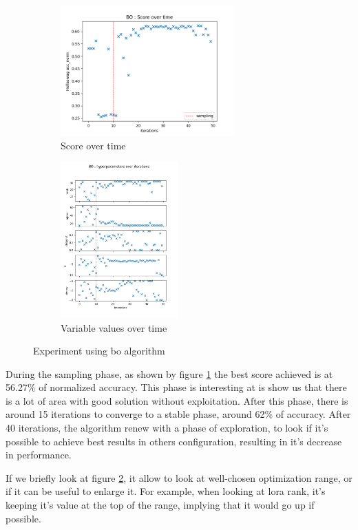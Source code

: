 \begin{figure}[h!]
    \centering
    \begin{subfigure}[b]{.45\textwidth}
      \centering
      \includegraphics[height = 5cm]{assets/img/chap_4/experiments/plots/exp12_score_over_time.png}
      \caption{Score over time}
      \label{fig:exp12_score_time}
    \end{subfigure}%
    \begin{subfigure}[b]{.45\textwidth}
      \centering
      \includegraphics[height = 6cm]{assets/img/chap_4/experiments/plots/exp12_variables_over_time.png}
      \caption{Variable values over time}
      \label{fig:exp12_var_time}
    \end{subfigure}
    \caption{Experiment using \acrshort{bo} algorithm}
    \label{fig:exp12_res}
\end{figure}

During the sampling phase, as shown by figure \ref{fig:exp12_score_time} the best score achieved is at 56.27\% of normalized accuracy. This phase is interesting at is show us that there is a lot of area with good solution without exploitation. After this phase, there is around 15 iterations to converge to a stable phase, around 62\% of accuracy. After 40 iterations, the algorithm renew with a phase of exploration, to look if it's possible to achieve best results in others configuration, resulting in it's decrease in performance.

If we briefly look at figure \ref{fig:exp12_var_time}, it allow to look at well-chosen optimization range, or if it can be useful to enlarge it. For example, when looking at \acrshort{lora} rank, it's keeping it's value at the top of the range, implying that it would go up if possible. 

